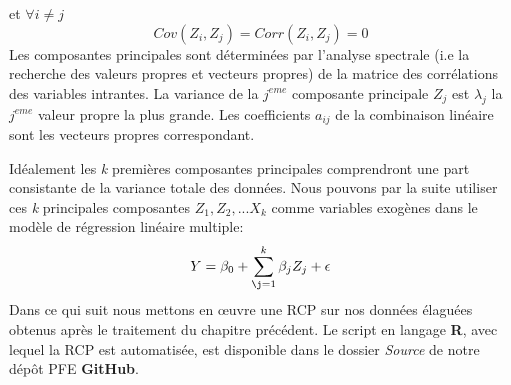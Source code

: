	et $\forall i \neq j$
	\begin{equation*}
		Cov(Z_i,Z_j) = Corr(Z_i,Z_j) = 0
	\end{equation*}
	Les composantes principales sont déterminées par l'analyse spectrale (i.e la recherche des valeurs propres et vecteurs propres) de la matrice des corrélations des variables intrantes. La variance de la $j^{eme}$ composante principale $Z_{j}$ est $\lambda_{j}$ la $j^{eme}$ valeur propre la plus grande. Les coefficients $a_{ij}$ de la combinaison linéaire sont les vecteurs propres correspondant.\par
	Idéalement les \textit{k} premières composantes principales comprendront une part consistante de la variance totale des données. Nous pouvons par la suite utiliser ces \textit{k} principales composantes $Z_1,Z_2,...X_k$ comme variables exogènes dans le modèle de régression linéaire multiple:
		\begin{equation*}
		Y=\beta_0 + \sum_{\j=1}^{k} \beta_jZ_j + \epsilon 
		\end{equation*}
	Dans ce qui suit nous mettons en œuvre une RCP sur nos données élaguées obtenus après le traitement du chapitre précédent. Le script en langage \textbf{R}, avec lequel la RCP est automatisée, est disponible dans le dossier \textit{Source} de notre dépôt PFE \textbf{GitHub}\cite{this}.
